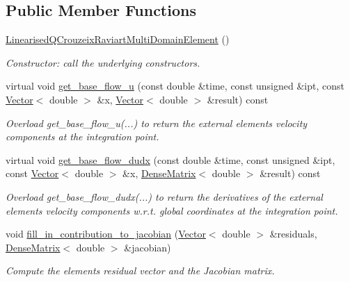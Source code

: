 \subsection*{Public Member Functions}
\begin{DoxyCompactItemize}
\item 
\hyperlink{classLinearisedQCrouzeixRaviartMultiDomainElement_aadd61b718fb0c041153c085a670e0beb}{Linearised\+Q\+Crouzeix\+Raviart\+Multi\+Domain\+Element} ()
\begin{DoxyCompactList}\small\item\em Constructor\+: call the underlying constructors. \end{DoxyCompactList}\item 
virtual void \hyperlink{classLinearisedQCrouzeixRaviartMultiDomainElement_afb43b8c81d6421ce18f5d07bda931621}{get\+\_\+base\+\_\+flow\+\_\+u} (const double \&time, const unsigned \&ipt, const \hyperlink{classoomph_1_1Vector}{Vector}$<$ double $>$ \&x, \hyperlink{classoomph_1_1Vector}{Vector}$<$ double $>$ \&result) const
\begin{DoxyCompactList}\small\item\em Overload get\+\_\+base\+\_\+flow\+\_\+u(...) to return the external element\textquotesingle{}s velocity components at the integration point. \end{DoxyCompactList}\item 
virtual void \hyperlink{classLinearisedQCrouzeixRaviartMultiDomainElement_a3be73b81d6e0cb9b9fba706620966a82}{get\+\_\+base\+\_\+flow\+\_\+dudx} (const double \&time, const unsigned \&ipt, const \hyperlink{classoomph_1_1Vector}{Vector}$<$ double $>$ \&x, \hyperlink{classoomph_1_1DenseMatrix}{Dense\+Matrix}$<$ double $>$ \&result) const
\begin{DoxyCompactList}\small\item\em Overload get\+\_\+base\+\_\+flow\+\_\+dudx(...) to return the derivatives of the external element\textquotesingle{}s velocity components w.\+r.\+t. global coordinates at the integration point. \end{DoxyCompactList}\item 
void \hyperlink{classLinearisedQCrouzeixRaviartMultiDomainElement_a7798d37a41ab3e965da4142b1731a9e4}{fill\+\_\+in\+\_\+contribution\+\_\+to\+\_\+jacobian} (\hyperlink{classoomph_1_1Vector}{Vector}$<$ double $>$ \&residuals, \hyperlink{classoomph_1_1DenseMatrix}{Dense\+Matrix}$<$ double $>$ \&jacobian)
\begin{DoxyCompactList}\small\item\em Compute the element\textquotesingle{}s residual vector and the Jacobian matrix. \end{DoxyCompactList}\end{DoxyCompactItemize}
